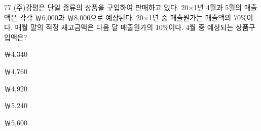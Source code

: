 \begin{question}{77}
(주)감평은 단일 종류의 상품을 구입하여 판매하고 있다. 20×1년 4월과 5월의 매출액은 각각 ￦6,000과 ￦8,000으로 예상된다. 20×1년 중 매출원가는 매출액의 70\%이다. 매월 말의 적정 재고금액은 다음 달 매출원가의 10\%이다. 4월 중 예상되는 상품구입액은?
\begin{choices}
  \item ￦4,340
  \item ￦4,760
  \item ￦4,920
  \item ￦5,240
  \item ￦5,600
\end{choices}
\end{question}
